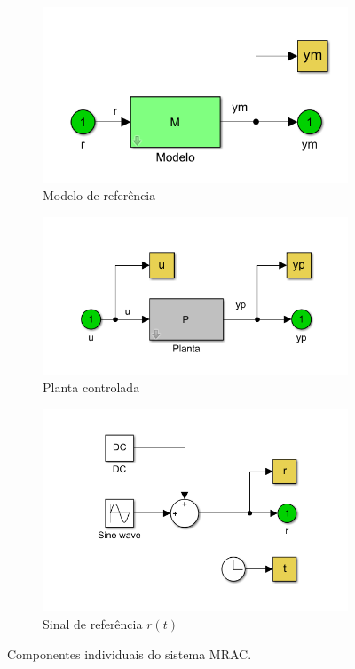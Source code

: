 \documentclass[10pt]{article}
\begin{document}
\begin{figure}[h!]
  \centering
  \begin{subfigure}[b]{0.32\textwidth}
    \centering
    \includegraphics[width=\textwidth]{img/diagrama_modelo.png}
    \caption{Modelo de referência}
    \label{fig:modelo_referencia}
  \end{subfigure}
  \hfill
  \begin{subfigure}[b]{0.32\textwidth}
    \centering
    \includegraphics[width=\textwidth]{img/diagrama_planta.png}
    \caption{Planta controlada}
    \label{fig:planta}
  \end{subfigure}
  \hfill
  \begin{subfigure}[b]{0.32\textwidth}
    \centering
    \includegraphics[width=\textwidth]{img/diagrama_referencia.png}
    \caption{Sinal de referência $r(t)$}
    \label{fig:referencia}
  \end{subfigure}
  \caption{Componentes individuais do sistema MRAC.}
  \label{fig:componentes_mrac}
\end{figure}
\end{document}
